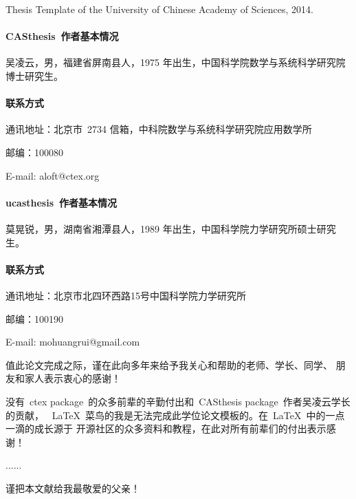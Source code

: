 \begin{publications}

Thesis Template of the University of Chinese Academy of Sciences, 2014.

\end{publications}

\begin{resume}

\paragraph{CASthesis~作者基本情况}
吴凌云，男，福建省屏南县人，1975 年出生，中国科学院数学与系统科学研究院博士研究生。

\paragraph{联系方式}
通讯地址：北京市~2734 信箱，中科院数学与系统科学研究院应用数学所

邮编：100080

E-mail: aloft@ctex.org

\paragraph{ucasthesis~作者基本情况}
莫晃锐，男，湖南省湘潭县人，1989 年出生，中国科学院力学研究所硕士研究生。

\paragraph{联系方式}
通讯地址：北京市北四环西路15号中国科学院力学研究所

邮编：100190

E-mail: mohuangrui@gmail.com

\end{resume}

\begin{thanks}

值此论文完成之际，谨在此向多年来给予我关心和帮助的老师、学长、同学、
朋友和家人表示衷心的感谢！

没有~ctex package~的众多前辈的辛勤付出和~CASthesis package~作者吴凌云学长的贡献，
~\LaTeX{}~菜鸟的我是无法完成此学位论文模板的。在~\LaTeX{}~中的一点一滴的成长源于
开源社区的众多资料和教程，在此对所有前辈们的付出表示感谢！

......

谨把本文献给我最敬爱的父亲！

\end{thanks}
